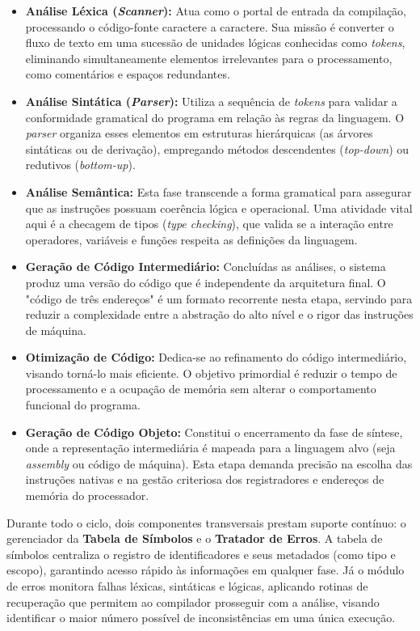 \begin{itemize}
    \item \textbf{Análise Léxica (\textit{Scanner}):} Atua como o portal de entrada da compilação, processando o código-fonte caractere a caractere. Sua missão é converter o fluxo de texto em uma sucessão de unidades lógicas conhecidas como \textit{tokens}, eliminando simultaneamente elementos irrelevantes para o processamento, como comentários e espaços redundantes.

    \item \textbf{Análise Sintática (\textit{Parser}):} Utiliza a sequência de \textit{tokens} para validar a conformidade gramatical do programa em relação às regras da linguagem. O \textit{parser} organiza esses elementos em estruturas hierárquicas (as árvores sintáticas ou de derivação), empregando métodos descendentes (\textit{top-down}) ou redutivos (\textit{bottom-up}).

    \item \textbf{Análise Semântica:} Esta fase transcende a forma gramatical para assegurar que as instruções possuam coerência lógica e operacional. Uma atividade vital aqui é a checagem de tipos (\textit{type checking}), que valida se a interação entre operadores, variáveis e funções respeita as definições da linguagem.

    \item \textbf{Geração de Código Intermediário:} Concluídas as análises, o sistema produz uma versão do código que é independente da arquitetura final. O "código de três endereços" é um formato recorrente nesta etapa, servindo para reduzir a complexidade entre a abstração do alto nível e o rigor das instruções de máquina.

    \item \textbf{Otimização de Código:} Dedica-se ao refinamento do código intermediário, visando torná-lo mais eficiente. O objetivo primordial é reduzir o tempo de processamento e a ocupação de memória sem alterar o comportamento funcional do programa.

    \item \textbf{Geração de Código Objeto:} Constitui o encerramento da fase de síntese, onde a representação intermediária é mapeada para a linguagem alvo (seja \textit{assembly} ou código de máquina). Esta etapa demanda precisão na escolha das instruções nativas e na gestão criteriosa dos registradores e endereços de memória do processador.
\end{itemize}

Durante todo o ciclo, dois componentes transversais prestam suporte contínuo: o gerenciador da \textbf{Tabela de Símbolos} e o \textbf{Tratador de Erros}. A tabela de símbolos centraliza o registro de identificadores e seus metadados (como tipo e escopo), garantindo acesso rápido às informações em qualquer fase. Já o módulo de erros monitora falhas léxicas, sintáticas e lógicas, aplicando rotinas de recuperação que permitem ao compilador prosseguir com a análise, visando identificar o maior número possível de inconsistências em uma única execução.

